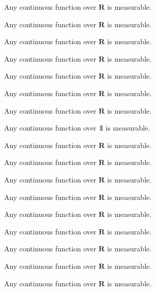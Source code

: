 \documentclass[a4paper, 11pt,openany]{book}%
\newtheorem[L]{thm}{Théorème}[section]
\newtheorem[M]{propo}[thm]{Proposition}
\newtheorem[M]{prop}[thm]{Propriété}
\newtheorem[M]{coro}[thm]{Corollaire}
\newtheorem[M]{lem}[thm]{Lemme}
\newtheorem[M,bodystyle=]{defi}[thm]{Définition}
\newtheorem[M,bodystyle=]{remark}[thm]{Remarque}
\newtheorem[M,bodystyle=]{met}[thm]{Méthode}
\newtheorem[M,bodystyle=]{ret}[thm]{A retenir}
\newtheorem[M,bodystyle=]{idee}[thm]{Idée}
\newtheorem[style=S,underline=false,bodystyle=]{exem}[thm]{Exemple}
\newtheorem[S,underline=false,bodystyle=]{exo}[thm]{Exercice}
\newtheorem[S,underline=false,bodystyle=]{appli}[thm]{Application}
\newtheorem[S,underline=false,bodystyle=]{sol}[thm]{Solution}
\newtheorem[S,underline=false,bodystyle=]{hypo}[thm]{Hypothesis}
\newtheorem[S,underline=false,bodystyle=]{nota}[thm]{Notation}
\def\un{{\mathchoice {\rm 1\mskip-4mu l} {\rm 1\mskip-4mu l}

{\rm 1\mskip-4.5mu l} {\rm 1\mskip-5mu l}}} %
\begin{document}
            



\begin{defi}



Any continuous function over $\mathbf{R}$ is measurable.

Any continuous function over $\mathbf{R}$ is measurable.

Any continuous function over $\mathbf{R}$ is measurable.

Any continuous function over $\mathbf{R}$ is measurable.

Any continuous function over $\mathbf{R}$ is measurable.

Any continuous function over $\mathbf{R}$ is measurable.

Any continuous function over $\mathbf{R}$ is measurable.

Any continuous function over $\un$ is measurable.

\end{defi}



\begin{propo}



Any continuous function over $\mathbf{R}$ is measurable.

Any continuous function over $\mathbf{R}$ is measurable.

Any continuous function over $\mathbf{R}$ is measurable.

Any continuous function over $\mathbf{R}$ is measurable.

Any continuous function over $\mathbf{R}$ is measurable.

Any continuous function over $\mathbf{R}$ is measurable.

Any continuous function over $\mathbf{R}$ is measurable.

Any continuous function over $\mathbf{R}$ is measurable.

\end{propo}



\begin{exem}

Any continuous function over $\mathbf{R}$ is measurable.

\end{exem}
\end{document}

